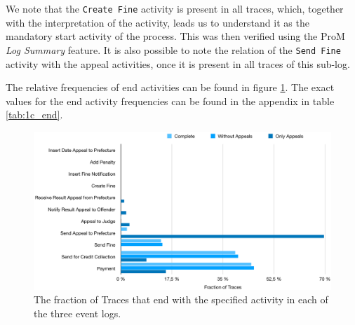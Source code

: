 \documentclass[12pt]{report}
\begin{document}
We note that the \texttt{Create Fine} activity is present in all traces, which, together with the interpretation of the activity, leads us to understand it as the mandatory start activity of the process. This was then verified using the ProM \emph{Log Summary} feature. It is also possible to note the relation of the \texttt{Send Fine} activity with the appeal activities, once it is present in all traces of this sub-log.

The relative frequencies of end activities can be found in figure \ref{fig:end_frequencies}. The exact values for the end activity frequencies can be found in the appendix in table \ref{tab:1c_end}. 
\begin{figure}[H]
  \centering
  \includegraphics[width=\textwidth]{figures/end_frequencies.png}
  \caption{The fraction of Traces that end with the specified activity in each of the three event logs.}
  \label{fig:end_frequencies}
\end{figure}
\end{document}
